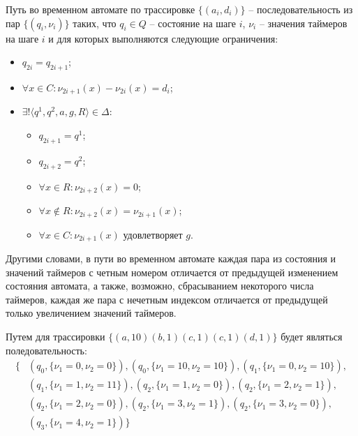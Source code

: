 \documentclass[times,specification,annotation]{itmo-student-thesis}
\begin{document}
\begin{definition}
  Путь во временном автомате по трассировке $\{\left( a_i, d_i \right)\}$ -- последовательность из пар $\{\left( q_i, \nu_i \right)\}$ таких, 
  что $q_i \in Q$ -- состояние на шаге $i$, $\nu_i$ -- значения таймеров на шаге $i$ и для которых выполняются следующие ограничения:
  \begin{itemize}
    \item $q_{2i} = q_{2i+1}$;
    \item $\forall x \in C: \nu_{2i+1}(x) - \nu_{2i}(x) = d_i$;
    \item $\exists! \langle q^1, q^2, a, g, R \rangle \in \Delta$: 
      \begin{itemize}
	\item $q_{2i+1} = q^1$;
	\item $q_{2i+2} = q^2$;
        \item $\forall x \in R: \nu_{2i+2}(x) = 0$;
	\item $\forall x \not\in R: \nu_{2i+2}(x) = \nu_{2i+1}(x)$;
	\item $\forall x \in C: \nu_{2i+1}(x)$ удовлетворяет $g$.
      \end{itemize}
  \end{itemize}
\end{definition}

Другими словами, в пути во временном автомате каждая пара из состояния и значений таймеров с 
четным номером отличается от предыдущей изменением состояния автомата, а также, возможно, сбрасыванием некоторого числа таймеров, 
каждая же пара с нечетным индексом отличается от предыдущей только увеличением значений таймеров.

\begin{example}
  Путем для трассировки $\{ \left( a, 10 \right) \left( b, 1 \right) \left( c, 1 \right) \left( c, 1 \right) \left( d, 1 \right) \}$
  будет являться поледовательность: 
  \begin{equation}
    \begin{split}
      \{ &\left( q_0, \{ \nu_1 = 0, \nu_2 = 0 \} \right), \left( q_0, \{ \nu_1 = 10, \nu_2 = 10 \} \right), \left( q_1, \{ \nu_1 = 0, \nu_2 = 10 \} \right), \\
	 &\left( q_1, \{ \nu_1 = 1, \nu_2 = 11 \} \right), \left( q_2, \{ \nu_1 = 1, \nu_2 = 0 \} \right), \left( q_2, \{ \nu_1 = 2, \nu_2 = 1 \} \right), \\
	 &\left( q_2, \{ \nu_1 = 2, \nu_2 = 0 \} \right), \left( q_2, \{ \nu_1 = 3, \nu_2 = 1 \}  \right), \left( q_2, \{ \nu_1 = 3, \nu_2 = 0 \} \right), \\
         &\left( q_3, \{ \nu_1 = 4, \nu_2 = 1 \} \right) \}
    \end{split}
  \end{equation}
\end{example}
\end{document}
